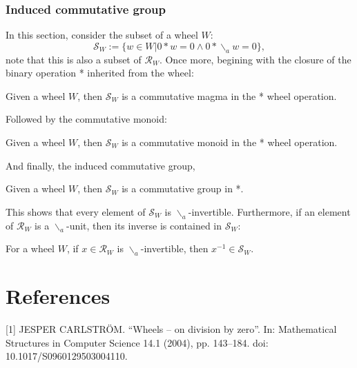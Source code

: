 \subsection{Induced commutative group}
In this section, consider the subset of a wheel $W$:
\[
  \mathcal{S}_{W} := \{ w \in W | 0*w = 0 \wedge 0*\backslash_{a}w = 0 \},
\]
note that this is also a subset of $\mathcal{R}_{W}$. Once more, begining with the closure of the binary operation *
inherited from the wheel:
\begin{definition}
  \leanok
  Given a wheel $W$, then $\mathcal{S}_{W}$ is a commutative magma in the * wheel operation.
\end{definition}
Followed by the commutative monoid:
\begin{definition}
  \leanok
  Given a wheel $W$, then $\mathcal{S}_{W}$ is a commutative monoid in the * wheel operation.
\end{definition}
And finally, the induced commutative group,
\begin{definition}
  \leanok
  Given a wheel $W$, then $\mathcal{S}_{W}$ is a commutative group in *.
\end{definition}
This shows that every element of $\mathcal{S}_{W}$ is $\backslash_{a}$-invertible. Furthermore, if an element of $\mathcal{R}_{W}$ 
is a $\backslash_{a}$-unit, then its inverse is contained in $\mathcal{S}_{W}$:
\begin{proposition}
  \leanok
  For a wheel $W$, if $x \in \mathcal{R}_{W}$ is $\backslash_{a}$-invertible, then $x^{-1} \in \mathcal{S}_{W}$.
\end{proposition}
\chapter{References}
[1] JESPER CARLSTRÖM. “Wheels – on division by zero”. In: Mathematical Structures in Computer Science 14.1 (2004), pp. 143–184. doi: 10.1017/S0960129503004110.